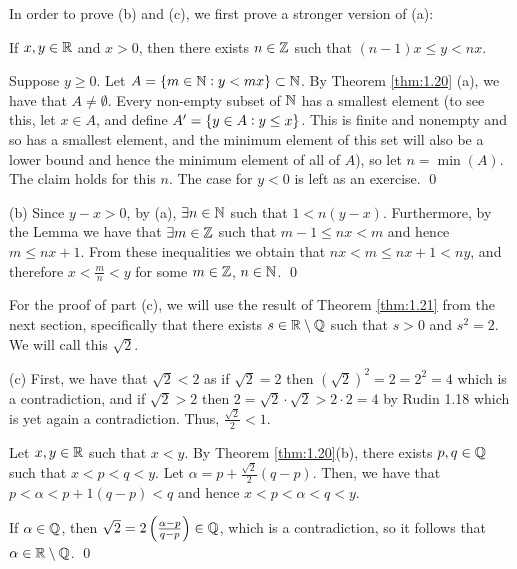 In order to prove (b) and (c), we first prove a stronger version of (a):
\begin{nlemma}{}
    If $x, y \in \mathbb{R}$ and $x > 0$, then there exists $n \in \mathbb{Z}$ such that $(n-1)x \leq y < nx$. 
\end{nlemma}
\begin{nproof}
    Suppose $y \geq 0$. Let $A = \set{m \in \mathbb{N}: y < mx} \subset \mathbb{N}$. By Theorem \ref{thm:1.20} (a), we have that $A \neq \emptyset$. Every non-empty subset of $\mathbb{N}$ has a smallest element (to see this, let $x \in A$, and define $A' = \set{y \in A: y \leq x}$. This is finite and nonempty and so has a smallest element, and the minimum element of this set will also be a lower bound and hence the minimum element of all of $A$), so let $n = \min(A)$. The claim holds for this $n$.
    The case for $y < 0$ is left as an exercise. \qed
\end{nproof}
\begin{nproof}
    (b) Since $y - x > 0$, by (a), $\exists n \in \mathbb{N}$ such that $1 < n(y-x)$. Furthermore, by the Lemma we have that $\exists m \in \mathbb{Z}$ such that $m - 1 \leq nx < m$ and hence $m \leq nx + 1$. From these inequalities we obtain that $nx < m \leq nx + 1 < ny$, and therefore $x < \frac{m}{n} < y$ for some $m \in \mathbb{Z}$, $n \in \mathbb{N}$. \qed
\end{nproof}
For the proof of part (c), we will use the result of Theorem \ref{thm:1.21} from the next section, specifically that there exists $s \in \mathbb{R} \setminus \mathbb{Q}$ such that $s > 0$ and $s^2 = 2$. We will call this $\sqrt{2}$.
\begin{nproof}
    (c) First, we have that $\sqrt{2} < 2$ as if $\sqrt{2} = 2$ then $(\sqrt{2})^2 = 2 = 2^2 = 4$ which is a contradiction, and if $\sqrt{2} > 2$ then $2 = \sqrt{2}\cdot \sqrt{2} > 2\cdot 2 = 4$ by Rudin 1.18 which is yet again a contradiction. Thus, $\frac{\sqrt{2}}{2} < 1$. 
    
    Let $x, y \in \mathbb{R}$ such that $x < y$. By Theorem \ref{thm:1.20}(b), there exists $p, q \in \mathbb{Q}$ such that $x < p < q < y$. Let $\alpha = p + \frac{\sqrt{2}}{2}(q - p)$. Then, we have that $p  <\alpha < p + 1(q-p) < q$ and hence $x < p < \alpha < q < y$.

    If $\alpha \in \mathbb{Q}$, then $\sqrt{2} = 2\left(\frac{\alpha-p}{q-p}\right) \in \mathbb{Q}$, which is a contradiction, so it follows that $\alpha \in \mathbb{R} \setminus \mathbb{Q}$. \qed
\end{nproof}

